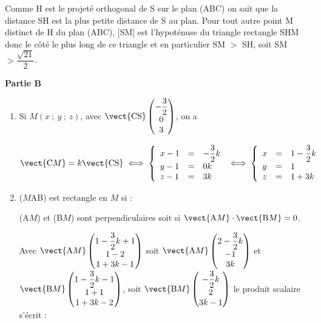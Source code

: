 \begin{enumerate}
\begin{enumerate}
Comme H est le projeté orthogonal de S sur le plan (ABC) on sait que la distance SH est la plus petite distance de S au plan. Pour tout autre point M distinct de H du plan (ABC), [SM] est l'hypoténuse du triangle rectangle SHM donc le côté le plus long de ce triangle et en particulier SM $> $ SH, soit SM $ > \dfrac{\sqrt{21}}{2}$.
	\end{enumerate}
\end{enumerate}

\medskip

\begin{center}\textbf{Partie B} \end{center}

\smallskip

\begin{enumerate}
\item Si $M(x~;~y~;~z)$, avec $\vect{\text{CS}}\begin{pmatrix}- \dfrac 32\\0\\3\end{pmatrix}$, on a 

$\vect{\text{C}M} = k\vect{\text{CS}} \iff \left\{\begin{array}{l c l}
x - 1&=&- \dfrac 32 k\\
y - 1&=&0k\\
z - 1&=&3k
\end{array}\right. \iff \left\{\begin{array}{l c l}
x &=& 1 - \dfrac 32 k\\
y &=&1\\
z &=&1 + 3k
\end{array}\right.$
	\item ($M$AB) est rectangle en $M$ si :
	
(A$M$) et (B$M$) sont perpendiculaires soit si $\vect{\text{A}M} \cdot \vect{\text{B}M} = 0$.

Avec $\vect{\text{A}M}\begin{pmatrix}1 - \dfrac 32 k + 1\\1 - 2\\1 + 3k - 1\end{pmatrix}$ soit $\vect{\text{A}M}\begin{pmatrix} 2 - \dfrac 32 k\\ - 1\\3k\end{pmatrix}$ et 
$\vect{\text{B}M}\begin{pmatrix}1 - \dfrac 32 k - 1\\1 + 1\\1 + 3k - 2\end{pmatrix}$, soit $\vect{\text{B}M}\begin{pmatrix}- \dfrac 32 k \\2\\3k - 1\end{pmatrix}$ le produit scalaire s'écrit :


\end{enumerate}

